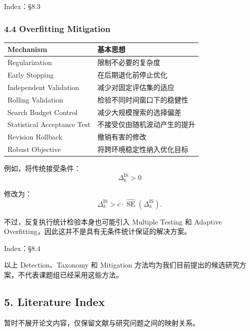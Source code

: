Index：§8.3

\hypertarget{part-1-10-0001-overfitting-mitigation}{%
\subsubsection{4.4 Overfitting Mitigation}\label{part-1-10-0001-overfitting-mitigation}}

\begin{readertable}
\begin{longtable}[]{@{}
  >{\raggedright\arraybackslash}p{}
  >{\raggedright\arraybackslash}p{}@{}}
\toprule
Mechanism & 基本思想 \\
\midrule
\endhead
Regularization & 限制不必要的复杂度 \\
Early Stopping & 在后期退化前停止优化 \\
Independent Validation & 减少对固定评估集的适应 \\
Rolling Validation & 检验不同时间窗口下的稳健性 \\
Search Budget Control & 减少大规模搜索的选择偏差 \\
Statistical Acceptance Test & 不接受仅由随机波动产生的提升 \\
Revision Rollback & 撤销有害的修改 \\
Robust Objective & 将跨环境稳定性纳入优化目标 \\
\bottomrule
\end{longtable}
\end{readertable}

例如，将传统接受条件：
\[\Delta_k^{\mathrm{IS}}>0\]

修改为：
\[\Delta_k^{\mathrm{IS}}
>
c\cdot
\widehat{\operatorname{SE}}
(\Delta_k^{\mathrm{IS}}).\]

不过，反复执行统计检验本身也可能引入 Multiple Testing 和 Adaptive Overfitting，因此这并不是具有无条件统计保证的解决方案。

Index：§8.4

以上 Detection、Taxonomy 和 Mitigation 方法均为我们目前提出的候选研究方案，不代表课题组已经采用这些方法。

\hypertarget{part-1-10-0001-literature-index}{%
\subsection{5. Literature Index}\label{part-1-10-0001-literature-index}}

暂时不展开论文内容，仅保留文献与研究问题之间的映射关系。

